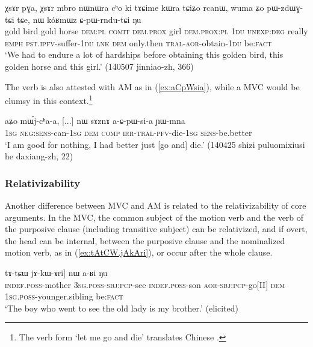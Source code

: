 \begin{exe}
\ex  \label{ex:CpWrndutCi}
\gll χsɤr pɣa, χsɤr mbro nɯnɯra cʰo ki tɤɕime kɯra tɕiʑo rcanɯ, wuma ʑo pɯ-zdɯɣ-tɕi tɕe, nɯ kóʁmɯz ɕ-pɯ-rndu-tɕi ŋu \\
gold bird gold horse \textsc{dem}:\textsc{pl} \textsc{comit} \textsc{dem}.\textsc{prox} girl \textsc{dem}.\textsc{prox}:\textsc{pl} \textsc{1du} \textsc{unexp}:\textsc{deg} really \textsc{emph} \textsc{pst}.\textsc{ipfv}-suffer-\textsc{1du} \textsc{lnk} \textsc{dem} only.then \textsc{tral}-\textsc{aor}-obtain-\textsc{1du} be:\textsc{fact} \\
\glt `We had to endure a lot of hardships before obtaining this golden bird, this golden horse and this girl.' (140507 jinniao-zh, 366)
\end{exe}


The verb  is also attested with AM as in (\ref{ex:aCpWsia}), while a MVC would be clumsy in this context.\footnote{The verb form  `let me go and die' translates Chinese . }

\begin{exe}
\ex  \label{ex:aCpWsia}
\gll aʑo mɯ́j-cʰa-a, [...] nɯ sɤznɤ a-ɕ-pɯ-si-a ɲɯ-mna \\
\textsc{1sg} \textsc{neg}:\textsc{sens}-can-\textsc{1sg} { } \textsc{dem} \textsc{comp} \textsc{irr}-\textsc{tral}-\textsc{pfv}-die-\textsc{1sg} \textsc{sens}-be.better \\
\glt `I am good for nothing, I had better just [go and] die.' (140425 shizi puluomixiusi he daxiang-zh, 22)
\end{exe}

\subsubsection{Relativizability} \label{sec:AM.mvc.relativizability}
Another difference between MVC and AM is related to the relativizability of core arguments. In the MVC, the common subject of the motion verb and the verb of the purposive clause (including transitive subject) can be relativized, and if overt, the head can be internal, between the purposive clause and the nominalized motion verb, as  in (\ref{ex:tAtCW.jAkAri}), or occur after the whole clause.

\begin{exe}
\ex  \label{ex:tAtCW.jAkAri}
\gll  [[tɤ-mu ɯ-kɯ-rtoʁ] tɤ-tɕɯ jɤ-kɯ-ɤri] nɯ a-ʁi ŋu \\
\textsc{indef}.\textsc{poss}-mother \textsc{3sg}.\textsc{poss}-\textsc{sbj}:\textsc{pcp}-see \textsc{indef}.\textsc{poss}-son \textsc{aor}-\textsc{sbj}:\textsc{pcp}-go[II] \textsc{dem} \textsc{1sg}.\textsc{poss}-younger.sibling be:\textsc{fact} \\
\glt `The boy who went to see the old lady is my brother.' (elicited)
\end{exe}

